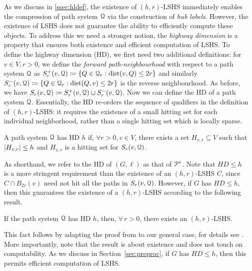As we discuss in \cref{ssec:hldef}, the existence of $(h,r)$-LSHS immediately enables the compression of path system $\calQ$ via the construction of \emph{hub labels}. 
However, the existence of LSHS does not guarantee the ability to efficiently compute these objects. 
To address this we need a stronger notion, the \emph{highway dimension} is a property that ensures both existence and efficient computation of LSHS.
To define the highway dimension (HD), we first need two additional definitions:
for $v\in V, r>0$, we define the \emph{forward path-neighbourhood} with respect to a path system $\calQ$ as $
S_r^+(v,\calQ) \defeq\crl*{Q\in\calQ_r: \dist(v,Q)\leq 2r}$ and similarly $S_r^-(v,\calQ) \defeq\crl*{Q\in\calQ_r: \dist(Q,v)\leq 2r}$ is the reverse neighbourhood.
As before, we have $S_r(v,\calQ) \defeq S_r^+(v,\calQ)\cup S_r^-(v,\calQ)$. 
Now we can define the HD of a path system $\calQ$. 
Essentially, the HD re-orders the sequence of qualifiers in the definition of $(h,r)$-LSHS: it requires the existence of a small hitting set for each individual neighborhood, rather than a single hitting set which is locally sparse. 
\begin{definition}	\label{def:hddef}
	A path system $\calQ$ has HD $h$ if, $\forall r>0,v\in V$, there exists a set $H_{v,r}\subseteq V$ such that $\card{H_{v,r}}\leq h$ and $H_{v,r}$ is a hitting set for $S_r(v,\calQ)$.
\end{definition}

As shorthand, we refer to the HD of $(G,\ell)$ as that of $\PS$. 
Note that $HD\leq h$ is a more stringent requirement than the existence of an $(h,r)$-LSHS $C$, since $C\cap B_{2r}(v)$ need not hit all the paths in $S_r(v,\calQ)$. 
However, if $G$ has $HD \leq h$, then this guarantees the existence of a $(h,r)$-LSHS according to the following result.
\begin{proposition}\label{prop:equiv}
If the path system $\calQ$ has HD $h$, then, $\forall\,r>0$, there exists an $(h,r)$-LSHS.
\end{proposition}

This fact follows by adapting the proof from \cite[Theorem 4.2]{highway2013} to our general case, for details see \cite{TechReport}.
More importantly, note that the result is about existence and does not touch on computability.
As we discuss in Section~\ref{sec:preproc}, if $G$ has $HD \leq h$, then this permits efficient computation of LSHS.

